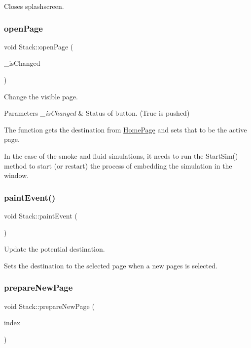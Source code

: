Closes splashscreen. \mbox{\label{classStack_a3663db1c1578aabe63286d4f2bb6fc6f}} 
\subsubsection{\texorpdfstring{openPage}{openPage}}
{\footnotesize\ttfamily void Stack\+::open\+Page (\begin{DoxyParamCaption}\item[{bool}]{\+\_\+is\+Changed }\end{DoxyParamCaption})\hspace{0.3cm}{\ttfamily [slot]}}

Change the visible page. 
\begin{DoxyParams}{Parameters}
{\em \+\_\+is\+Changed} & Status of button. (True is pushed)\\
\hline
\end{DoxyParams}
The function gets the destination from \mbox{\hyperlink{classHomePage}{Home\+Page}} and sets that to be the active page.

In the case of the smoke and fluid simulations, it needs to run the Start\+Sim() method to start (or restart) the process of embedding the simulation in the window. \mbox{\label{classStack_a58526db5899d5e03a6ad306a96f91d62}} 
\subsubsection{\texorpdfstring{paintEvent()}{paintEvent()}}
{\footnotesize\ttfamily void Stack\+::paint\+Event (\begin{DoxyParamCaption}\item[{Q\+Paint\+Event $\ast$}]{ }\end{DoxyParamCaption})\hspace{0.3cm}{\ttfamily [protected]}}

Update the potential destination.

Sets the destination to the selected page when a new pages is selected. \mbox{\label{classStack_a836814b5492af3a0a4cc613d11b56397}} 
\subsubsection{\texorpdfstring{prepareNewPage}{prepareNewPage}}
{\footnotesize\ttfamily void Stack\+::prepare\+New\+Page (\begin{DoxyParamCaption}\item[{int}]{index }\end{DoxyParamCaption})\hspace{0.3cm}{\ttfamily [slot]}}

